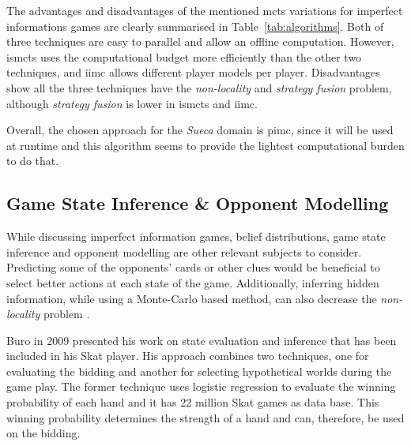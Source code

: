 The advantages and disadvantages of the mentioned \ac{mcts} variations for imperfect informations games are clearly summarised in Table~\ref{tab:algorithms}.
Both of three techniques are easy to parallel and allow an offline computation. However, \ac{ismcts} uses the computational budget more efficiently than the other two techniques, and \ac{iimc} allows different player models per player.
Disadvantages show all the three techniques have the \emph{non-locality} and \emph{strategy fusion} problem, although \emph{strategy fusion} is lower in \ac{ismcts} and \ac{iimc}.

Overall, the chosen approach for the \emph{Sueca} domain is \ac{pimc}, since it will be used at runtime and this algorithm seems to provide the lightest computational burden to do that.



\subsection{Game State Inference \& Opponent Modelling}


While discussing imperfect information games, belief distributions, game state inference and opponent modelling are other relevant subjects to consider.
Predicting some of the opponents' cards or other clues would be beneficial to select better actions at each state of the game. Additionally, inferring hidden information, while using a Monte-Carlo based method, can also decrease the \emph{non-locality} problem \cite{Cowling2012}.


Buro in 2009 \cite{Buro} presented his work on state evaluation and inference that has been included in his Skat player.
His approach combines two techniques, one for evaluating the bidding and another for selecting hypothetical worlds during the game play.
The former technique uses logistic regression to evaluate the winning probability of each hand and it has 22 million Skat games as data base.
This winning probability determines the strength of a hand and can, therefore, be used on the bidding.


